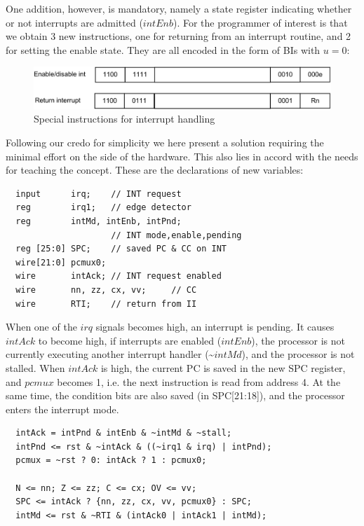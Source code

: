 One addition, however, is mandatory, namely a state register indicating whether or not interrupts
are admitted ($intEnb$). For the programmer of interest is that we obtain 3 new instructions, one
for returning from an interrupt routine, and 2 for setting the enable state. They are all encoded
in the form of BIs with $u = 0$:
\begin{figure}[h!]
  \centering
  \includegraphics[width=.9\textwidth]{i/f.png}
  \caption{Special instructions for interrupt handling}
  \label{fig:ih}
\end{figure}

Following our credo for simplicity we here present a solution requiring the minimal effort on the side
of the hardware. This also lies in accord with the needs for teaching the concept. These are the
declarations of new variables:
\begin{verbatim}
  input      irq;    // INT request
  reg        irq1;   // edge detector
  reg        intMd, intEnb, intPnd;
                     // INT mode,enable,pending
  reg [25:0] SPC;    // saved PC & CC on INT
  wire[21:0] pcmux0;
  wire       intAck; // INT request enabled
  wire       nn, zz, cx, vv;     // CC
  wire       RTI;    // return from II
\end{verbatim}

When one of the $irq$ signals becomes high, an interrupt is pending. It causes $intAck$ to become
high, if interrupts are enabled ($intEnb$), the processor is not currently executing another
interrupt handler (\textasciitilde{}$intMd$), and the processor is not stalled. When $intAck$ is
high, the current PC is saved in the new SPC register, and $pcmux$ becomes 1, i.e. the next
instruction is read from address 4. At the same time, the condition bits are also saved (in
SPC[21:18]), and the processor enters the interrupt mode.
\begin{verbatim}
  intAck = intPnd & intEnb & ~intMd & ~stall;
  intPnd <= rst & ~intAck & ((~irq1 & irq) | intPnd);
  pcmux = ~rst ? 0: intAck ? 1 : pcmux0;
 
  N <= nn; Z <= zz; C <= cx; OV <= vv;
  SPC <= intAck ? {nn, zz, cx, vv, pcmux0} : SPC;
  intMd <= rst & ~RTI & (intAck0 | intAck1 | intMd);
\end{verbatim}

